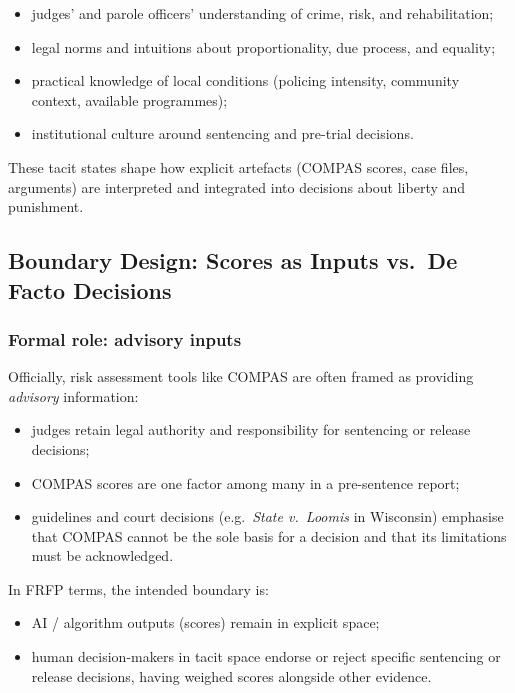 \begin{itemize}
  \item judges’ and parole officers’ understanding of crime, risk, and
        rehabilitation;
  \item legal norms and intuitions about proportionality, due process, and
        equality;
  \item practical knowledge of local conditions (policing intensity,
        community context, available programmes);
  \item institutional culture around sentencing and pre-trial decisions.
\end{itemize}

These tacit states shape how explicit artefacts (COMPAS scores, case files,
arguments) are interpreted and integrated into decisions about liberty and
punishment.

\subsection{Boundary Design: Scores as Inputs vs.\ De Facto Decisions}

\subsubsection*{Formal role: advisory inputs}

Officially, risk assessment tools like COMPAS are often framed as providing
\emph{advisory} information:

\begin{itemize}
  \item judges retain legal authority and responsibility for sentencing or
        release decisions;
  \item COMPAS scores are one factor among many in a pre-sentence report;
  \item guidelines and court decisions (e.g.\ \emph{State v.\ Loomis} in
        Wisconsin) emphasise that COMPAS cannot be the sole basis for a
        decision and that its limitations must be acknowledged.
\end{itemize}

In FRFP terms, the intended boundary is:

\begin{itemize}
  \item AI / algorithm outputs (scores) remain in explicit space;
  \item human decision-makers in tacit space endorse or reject specific
        sentencing or release decisions, having weighed scores alongside other
        evidence.
\end{itemize}

